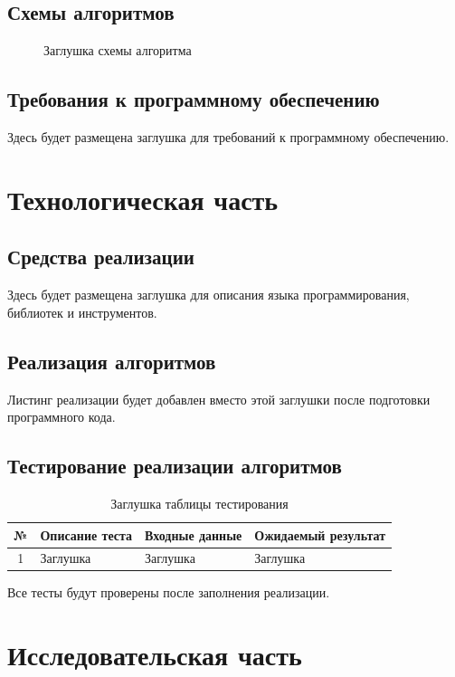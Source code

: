 \documentclass{bmstu}
\begin{document}
\section{Схемы алгоритмов}
\begin{figure}[H]
	\centering
	\fbox{\rule{0pt}{45mm}\rule{0.78\textwidth}{0pt}}
	\caption{Заглушка схемы алгоритма}
	\label{fig:algorithm-placeholder}
\end{figure}

\section{Требования к программному обеспечению}
Здесь будет размещена заглушка для требований к программному обеспечению.

\chapter{Технологическая часть}

\section{Средства реализации}
Здесь будет размещена заглушка для описания языка программирования, библиотек и инструментов.

\section{Реализация алгоритмов}
Листинг реализации будет добавлен вместо этой заглушки после подготовки программного кода.

\section{Тестирование реализации алгоритмов}
\begin{table}[H]
	\centering
	\caption{Заглушка таблицы тестирования}
	\label{tab:tests-placeholder}
	\begin{tabularx}{\textwidth}{|c|X|X|X|}
		\hline
		№ & Описание теста & Входные данные & Ожидаемый результат \\ \hline
		1 & Заглушка       & Заглушка       & Заглушка            \\ \hline
	\end{tabularx}
\end{table}

Все тесты будут проверены после заполнения реализации.

\chapter{Исследовательская часть}
\end{document}
